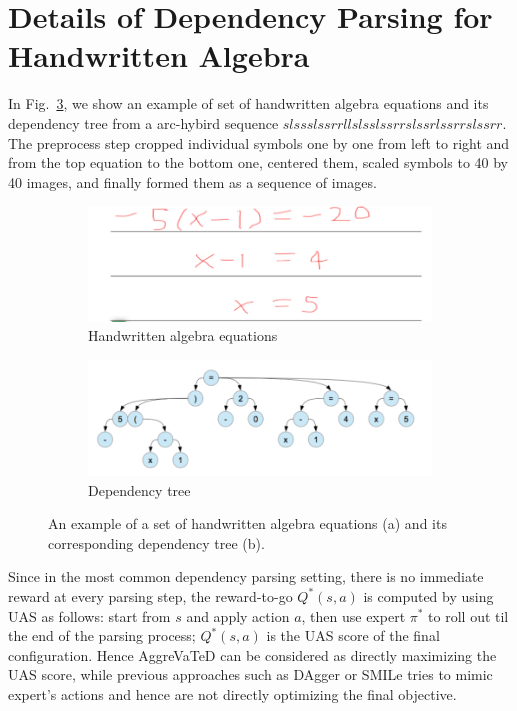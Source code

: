 \documentclass{article}
\begin{document}
\section{Details of Dependency Parsing for Handwritten Algebra}
\label{sec:parsing_example}
In Fig.~\ref{fig:algebra_example}, we show an example of set of handwritten algebra equations and its dependency tree from a arc-hybird sequence $slssslssrrllslsslssrrslssrlssrrslssrr$.  The preprocess step cropped individual symbols one by one from left to right and from the top equation to the bottom one, centered them, scaled symbols to 40 by 40 images,  and  finally formed  them  as  a  sequence of images. 

\begin{figure}[h]
	\centering
	\vspace{-2mm}
	\begin{subfigure}[l]{0.45\textwidth}
        \includegraphics[width=1.1\textwidth,keepaspectratio]{./figure/handwrittenexample.png}
        \caption{Handwritten algebra equations}
        \label{fig:cartpole}
    \end{subfigure}
	\begin{subfigure}[l]{0.5\textwidth}
        \includegraphics[width=1.1\textwidth,keepaspectratio]{./figure/handwrittentree.png}
        \caption{Dependency tree}
        \label{fig:acrobot}
    \end{subfigure}
    \caption{An example of a set of handwritten algebra equations (a) and its corresponding dependency tree (b).}
    \label{fig:algebra_example}
\end{figure}


Since in the most common dependency parsing setting, there is no immediate reward at every parsing step,
the reward-to-go $Q^*(s,a)$ is computed by using UAS as follows: start from $s$ and apply action $a$, then use expert $\pi^*$ to roll out til the end of the parsing process; $Q^*(s,a)$ is the UAS score of the final configuration. Hence AggreVaTeD can be considered as directly maximizing the UAS score, while previous approaches such as DAgger or SMILe \cite{Ross2011_AISTATS} tries to mimic expert's actions and hence are not directly optimizing the final objective. 
\end{document}

